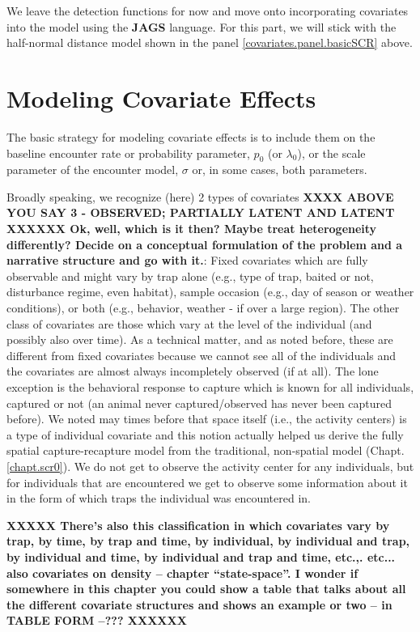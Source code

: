 We leave the detection functions for now and move onto incorporating
covariates into the model using the {\bf JAGS}
language.  For this part, we will stick with the half-normal distance
model shown in the panel \ref{covariates.panel.basicSCR} above.


\section{Modeling Covariate Effects}

The basic strategy for modeling covariate effects is to include them
on the baseline encounter rate or probability parameter, $p_{0}$ (or
$\lambda_{0}$), or the scale parameter of the encounter model,
$\sigma$ or, in some cases, both parameters.

Broadly speaking, we recognize (here) 2 types of covariates {\bf XXXX ABOVE
YOU SAY 3 - OBSERVED; PARTIALLY LATENT AND LATENT XXXXXX Ok, well,
which is it then? Maybe treat heterogeneity differently? Decide on a
conceptual formulation of the problem and a narrative structure and
go with it.}: Fixed
covariates which are fully observable and might vary by trap alone
(e.g., type of trap, baited or not, disturbance regime, even habitat),
sample occasion (e.g., day of season or weather conditions), or both
(e.g., behavior, weather - if over a large region).  The other class
of covariates are those which vary at the level of the individual (and
possibly also over time).  As a technical matter, and as noted before,
these are different from fixed covariates because we cannot see all of
the individuals and the covariates are almost always incompletely
observed (if at all).  The lone exception is the behavioral response
to capture which is known for all individuals, captured or not (an
animal never captured/observed has never been captured before).  We
noted may times before that space itself (i.e., the activity centers)
is a type of individual covariate and this notion actually helped us
derive the fully spatial capture-recapture model from the traditional,
non-spatial model (Chapt. \ref{chapt.scr0}). We do not get to observe
the activity center for any individuals, but for individuals that are
encountered we get to observe some information about it in the form of
which traps the individual was encountered in.


{\bf XXXXX There's also this classification in which covariates vary
  by trap, by time, by trap and time, by individual, by individual and
  trap, by individual and time, by individual and trap and time,
  etc.,. etc... also covariates on density -- chapter
  ``state-space''.  I wonder if somewhere in this chapter you could
  show a table that talks about all the different covariate structures
  and shows an example or two -- in TABLE FORM --??? 
XXXXXX}

